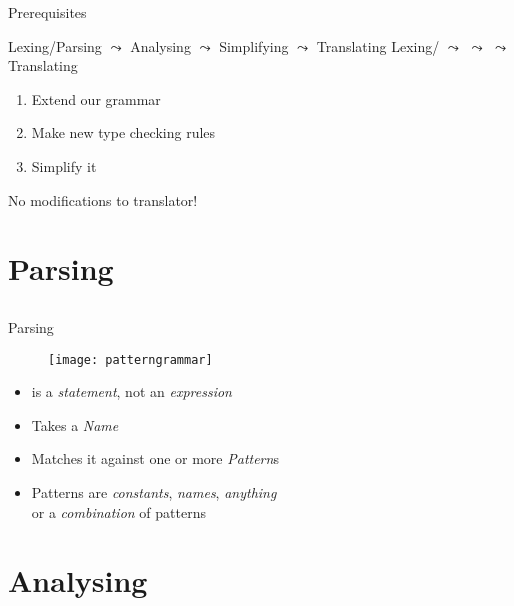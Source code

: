 \begin{frame}{Prerequisites}

    {Lexing/Parsing $\leadsto$ Analysing $\leadsto$ Simplifying $\leadsto$ Translating}
    {Lexing/ $\leadsto$  $\leadsto$  $\leadsto$ Translating}

  \pause
  \bigskip

  \begin{enumerate}
    \item Extend our grammar
    \item Make new type checking rules
    \item Simplify it
  \end{enumerate}

  \pause
  \bigskip

  No modifications to translator!

\end{frame}

\section{Parsing}
\subsection*{}

\begin{frame}{Parsing}

  \begin{figure}
    \texttt{[image: patterngrammar]}
  \end{figure}

  \begin{itemize}
    \item {} is a \emph{statement}, not an \emph{expression}
    \item Takes a \emph{Name}
    \item Matches it against one or more \emph{Pattern}s
    \item Patterns are \emph{constants}, \emph{names}, \emph{anything}\\
          or a \emph{combination} of patterns
  \end{itemize}

\end{frame}

\section{Analysing}
